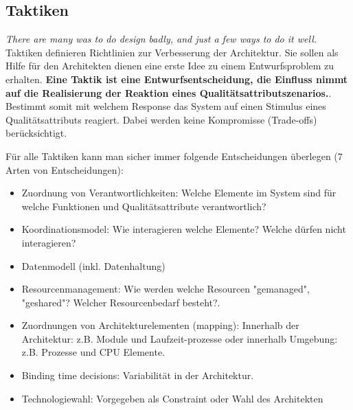 \subsection{Taktiken}
\emph{There are many was to do design badly, and just a few ways to do it well.} Taktiken definieren Richtlinien zur Verbesserung der Architektur. Sie sollen als Hilfe für den Architekten dienen eine erste Idee zu einem Entwurfsproblem zu erhalten. \textbf{Eine Taktik ist eine Entwurfsentscheidung, die Einfluss nimmt auf die Realisierung der Reaktion eines Qualitätsattributszenarios.}. Bestimmt somit mit welchem Response das System auf einen Stimulus eines Qualitätsattributs reagiert. Dabei werden keine Kompromisse (Trade-offs) berücksichtigt.

Für alle Taktiken kann man sicher immer folgende Entscheidungen überlegen (7 Arten von Entscheidungen):
\begin{itemize}
	\item Zuordnung von Verantwortlichkeiten: Welche Elemente im System sind für welche Funktionen und Qualitätsattribute verantwortlich?
	\item Koordinationsmodel: Wie interagieren welche Elemente? Welche dürfen nicht interagieren?
	\item Datenmodell (inkl. Datenhaltung)
	\item Resourcenmanagement: Wie werden welche Resourcen "gemanaged", "geshared"? Welcher Resourcenbedarf besteht?.
	\item Zuordnungen von Architekturelementen (mapping): Innerhalb der Architektur: z.B. Module und Laufzeit-prozesse oder innerhalb Umgebung: z.B. Prozesse und CPU Elemente.
	\item Binding time decisions: Variabilität in der Architektur.
	\item Technologiewahl: Vorgegeben als Constraint oder Wahl des Architekten
\end{itemize}


